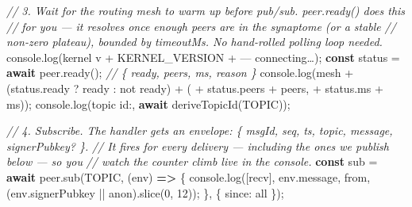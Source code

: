 \documentclass[
  nobib]{tufte-handout}
\newenvironment{Shaded}{}{}
\newcommand{\AttributeTok}[1]{\textcolor[rgb]{0.49,0.56,0.16}{#1}}
\newcommand{\BuiltInTok}[1]{\textcolor[rgb]{0.00,0.50,0.00}{#1}}
\newcommand{\CommentTok}[1]{\textcolor[rgb]{0.38,0.63,0.69}{\textit{#1}}}
\newcommand{\ControlFlowTok}[1]{\textcolor[rgb]{0.00,0.44,0.13}{\textbf{#1}}}
\newcommand{\DataTypeTok}[1]{\textcolor[rgb]{0.56,0.13,0.00}{#1}}
\newcommand{\DecValTok}[1]{\textcolor[rgb]{0.25,0.63,0.44}{#1}}
\newcommand{\FunctionTok}[1]{\textcolor[rgb]{0.02,0.16,0.49}{#1}}
\newcommand{\KeywordTok}[1]{\textcolor[rgb]{0.00,0.44,0.13}{\textbf{#1}}}
\newcommand{\NormalTok}[1]{#1}
\newcommand{\OperatorTok}[1]{\textcolor[rgb]{0.40,0.40,0.40}{#1}}
\newcommand{\StringTok}[1]{\textcolor[rgb]{0.25,0.44,0.63}{#1}}
\begin{document}
\begin{Shaded}
\begin{Highlighting}[]
\CommentTok{// 3. Wait for the routing mesh to warm up before pub/sub. peer.ready() does this}
\CommentTok{//    for you — it resolves once enough peers are in the synaptome (or a stable}
\CommentTok{//    non{-}zero plateau), bounded by timeoutMs. No hand{-}rolled polling loop needed.}
\BuiltInTok{console}\OperatorTok{.}\FunctionTok{log}\NormalTok{(}\StringTok{\textquotesingle{}kernel v\textquotesingle{}} \OperatorTok{+}\NormalTok{ KERNEL\_VERSION }\OperatorTok{+} \StringTok{\textquotesingle{} — connecting…\textquotesingle{}}\NormalTok{)}\OperatorTok{;}
\KeywordTok{const}\NormalTok{ status }\OperatorTok{=} \ControlFlowTok{await}\NormalTok{ peer}\OperatorTok{.}\FunctionTok{ready}\NormalTok{()}\OperatorTok{;}               \CommentTok{// \{ ready, peers, ms, reason \}}
\BuiltInTok{console}\OperatorTok{.}\FunctionTok{log}\NormalTok{(}\StringTok{\textquotesingle{}mesh \textquotesingle{}} \OperatorTok{+}\NormalTok{ (status}\OperatorTok{.}\AttributeTok{ready} \OperatorTok{?} \StringTok{\textquotesingle{}ready\textquotesingle{}} \OperatorTok{:} \StringTok{\textquotesingle{}not ready\textquotesingle{}}\NormalTok{) }\OperatorTok{+} \StringTok{\textquotesingle{} (\textquotesingle{}} \OperatorTok{+}\NormalTok{ status}\OperatorTok{.}\AttributeTok{peers} \OperatorTok{+} \StringTok{\textquotesingle{} peers, \textquotesingle{}} \OperatorTok{+}\NormalTok{ status}\OperatorTok{.}\AttributeTok{ms} \OperatorTok{+} \StringTok{\textquotesingle{}ms)\textquotesingle{}}\NormalTok{)}\OperatorTok{;}
\BuiltInTok{console}\OperatorTok{.}\FunctionTok{log}\NormalTok{(}\StringTok{\textquotesingle{}topic id:\textquotesingle{}}\OperatorTok{,} \ControlFlowTok{await} \FunctionTok{deriveTopicId}\NormalTok{(TOPIC))}\OperatorTok{;}

\CommentTok{// 4. Subscribe. The handler gets an envelope: \{ msgId, seq, ts, topic, message, signerPubkey? \}.}
\CommentTok{//    It fires for every delivery — including the ones we publish below — so you}
\CommentTok{//    watch the counter climb live in the console.}
\KeywordTok{const}\NormalTok{ sub }\OperatorTok{=} \ControlFlowTok{await}\NormalTok{ peer}\OperatorTok{.}\FunctionTok{sub}\NormalTok{(TOPIC}\OperatorTok{,}\NormalTok{ (env) }\KeywordTok{=\textgreater{}}\NormalTok{ \{}
  \BuiltInTok{console}\OperatorTok{.}\FunctionTok{log}\NormalTok{(}\StringTok{\textquotesingle{}[recv]\textquotesingle{}}\OperatorTok{,}\NormalTok{ env}\OperatorTok{.}\AttributeTok{message}\OperatorTok{,} \StringTok{\textquotesingle{}from\textquotesingle{}}\OperatorTok{,}\NormalTok{ (env}\OperatorTok{.}\AttributeTok{signerPubkey} \OperatorTok{||} \StringTok{\textquotesingle{}anon\textquotesingle{}}\NormalTok{)}\OperatorTok{.}\FunctionTok{slice}\NormalTok{(}\DecValTok{0}\OperatorTok{,} \DecValTok{12}\NormalTok{))}\OperatorTok{;}
\NormalTok{\}}\OperatorTok{,}\NormalTok{ \{ }\DataTypeTok{since}\OperatorTok{:} \StringTok{\textquotesingle{}all\textquotesingle{}}\NormalTok{ \})}\OperatorTok{;}


\end{Highlighting}
\end{Shaded}
\end{document}
